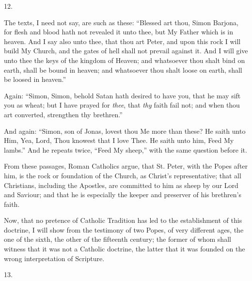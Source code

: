 12.

The texts, I need not say, are such as these: ``Blessed art
thou, Simon Barjona, for flesh and blood hath not revealed it unto
thee, but My Father which is in heaven. And I say also unto thee, that
thou art Peter, and upon this rock I will build My Church, and the
gates of hell shall not prevail against it. And I will give unto thee
the keys of the kingdom of Heaven; and whatsoever thou shalt bind on
earth, shall be bound in heaven; and whatsoever thou shalt loose on
earth, shall be loosed in heaven.''

Again: ``Simon, Simon, behold Satan hath desired to have you,
that he may sift you as wheat; but I have prayed for \emph{thee}, that
\emph{thy} faith fail not; and when thou art converted, strengthen thy
brethren.''

And again: ``Simon, son of Jonas, lovest thou Me more than
these? He saith unto Him, Yea, Lord, Thou knowest that I love Thee. He
saith unto him, Feed My lambs.'' And he repeats twice, ``Feed
My sheep,'' with the same question before it.

From these passages, Roman Catholics argue, that St. Peter, with
the Popes after him, is the rock or foundation of the Church, as
Christ's representative; that all Christians, including the Apostles,
are committed to him as sheep by our Lord and Saviour; and that he is
especially the keeper and preserver of his brethren's faith.

Now, that no pretence of Catholic Tradition has led to the
establishment of this doctrine, I will show from the testimony of two
Popes, of very different ages, the one of the sixth, the other of the
fifteenth century; the former of whom shall witness that it was not a
Catholic doctrine, the latter that it was founded on the wrong
interpretation of Scripture.

13.

